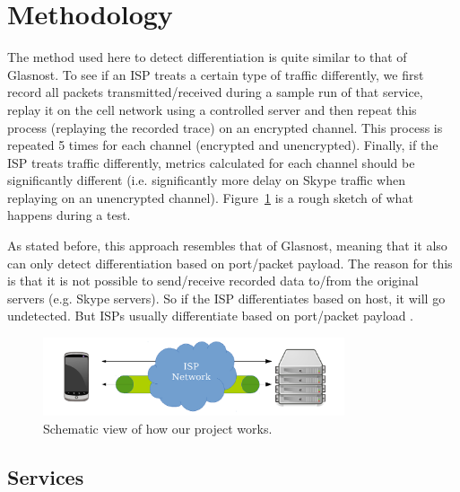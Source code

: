 \documentclass[letterpaper]{sig-alternate-10pt}
\begin{document}

\section{Methodology}
\label{sec:method}

The method used here to detect differentiation is quite similar to that of Glasnost. To see if an ISP treats a certain type of traffic differently, we first record all packets transmitted/received during a sample run of that service, replay it on the cell network using a controlled server and then repeat this process (replaying the recorded trace) on an encrypted channel. This process is repeated 5 times for each channel (encrypted and unencrypted). Finally, if the ISP treats traffic differently, metrics calculated for each channel should be significantly different (i.e. significantly more delay on 
Skype traffic when replaying on an unencrypted channel). Figure~\ref{fig:meddle} is a rough sketch of what happens during a test.

As stated before, this approach resembles that of Glasnost, meaning that it also can only detect differentiation based on port/packet payload. The reason for this is that it is not possible to send/receive recorded data to/from the original servers (e.g. Skype servers). So if the ISP differentiates based on host, it will go undetected. But ISPs usually differentiate based on port/packet payload \cite{glasnost}.

\begin{figure}[ht]
\centering
\includegraphics[width=3.5in]{figures/meddle}
\caption{Schematic view of how our project works.}
\label{fig:meddle}
\end{figure}

\subsection{Services}
\end{document}
